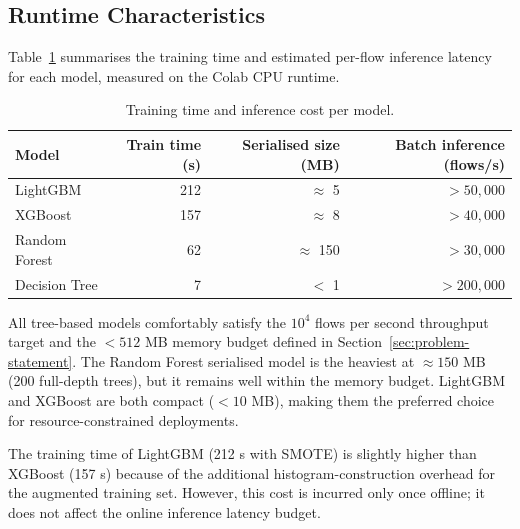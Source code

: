 \subsection{Runtime Characteristics}
\label{sec:exp-latency}

Table~\ref{tab:runtime} summarises the training time and estimated per-flow inference latency for each model, measured on the Colab CPU runtime.

\begin{table}[h]
\centering
\caption{Training time and inference cost per model.}
\label{tab:runtime}
\begin{tabular}{lrrr}
\toprule
\textbf{Model} & \textbf{Train time (s)} & \textbf{Serialised size (MB)} & \textbf{Batch inference (flows/s)} \\
\midrule
LightGBM      & 212 & $\approx$ 5   & $> 50{,}000$ \\
XGBoost       & 157 & $\approx$ 8   & $> 40{,}000$ \\
Random Forest &  62 & $\approx$ 150 & $> 30{,}000$ \\
Decision Tree &   7 & $<$ 1         & $> 200{,}000$ \\
\bottomrule
\end{tabular}
\end{table}

\noindent All tree-based models comfortably satisfy the $10^4$ flows per second throughput target and the $< 512$ MB memory budget defined in Section~\ref{sec:problem-statement}. The Random Forest serialised model is the heaviest at $\approx 150$ MB (200 full-depth trees), but it remains well within the memory budget. LightGBM and XGBoost are both compact ($< 10$ MB), making them the preferred choice for resource-constrained deployments.

The training time of LightGBM (212 s with SMOTE) is slightly higher than XGBoost (157 s) because of the additional histogram-construction overhead for the augmented training set. However, this cost is incurred only once offline; it does not affect the online inference latency budget.
